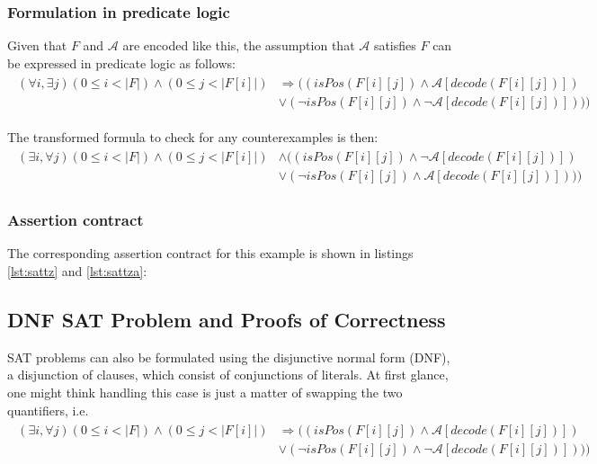 \documentclass{article}
\begin{document}
\subsubsection{Formulation in predicate logic}
Given that $F$ and $\mathcal{A}$ are encoded like this, the assumption that $\mathcal{A}$ satisfies $F$ can be expressed in predicate logic as follows:
\begin{gather*}\label{eq:cnf_sat_formal_1}
\begin{aligned}
(\forall i, \exists j) (0 \leq i < |F|) \wedge (0 \leq j < |F[i]|) &\Rightarrow ((isPos(F[i][j]) \wedge \mathcal{A}[decode(F[i][j])]) \\
&\vee (\neg isPos(F[i][j]) \wedge \neg \mathcal{A}[decode(F[i][j])])))
\end{aligned}
\end{gather*}

The transformed formula to check for any counterexamples is then:
\begin{gather*}\label{eq:cnf_sat_formal_2}
\begin{aligned}
(\exists i, \forall j) (0 \leq i < |F|) \wedge (0 \leq j < |F[i]|) &\wedge ((isPos(F[i][j]) \wedge \neg \mathcal{A}[decode(F[i][j])]) \\
&\vee (\neg isPos(F[i][j]) \wedge \mathcal{A}[decode(F[i][j])])))
\end{aligned}
\end{gather*}

\subsubsection{Assertion contract}
The corresponding assertion contract for this example is shown in listings \ref{lst:sattz} and \ref{lst:sattza}:



\subsection{DNF SAT Problem and Proofs of Correctness}
SAT problems can also be formulated using the disjunctive normal form (DNF), a disjunction of clauses, which consist of conjunctions of literals. At first glance, one might think handling this case is just a matter of swapping the two quantifiers, i.e.
\begin{gather*}\label{eq:dnf_sat_formal}
\begin{aligned}
(\exists i, \forall j) (0 \leq i < |F|) \wedge (0 \leq j < |F[i]|) &\Rightarrow ((isPos(F[i][j]) \wedge \mathcal{A}[decode(F[i][j])]) \\
&\vee (\neg isPos(F[i][j]) \wedge \neg \mathcal{A}[decode(F[i][j])])))
\end{aligned}
\end{gather*}
\end{document}

